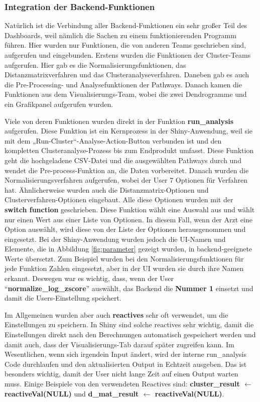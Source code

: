 \documentclass[12pt]{article}
\begin{document}
\subsubsection{Integration der Backend-Funktionen}

Natürlich ist die Verbindung aller Backend-Funktionen ein sehr großer Teil des Dashboards, weil nämlich die Sachen zu einem funktionierenden Programm führen. Hier wurden nur Funktionen, die von anderen Teams geschrieben sind, aufgerufen und eingebunden. Erstens wurden die Funktionen der Cluster-Teams aufgerufen. Hier gab es die Normalisierungsfunktionen, das Distanzmatrixverfahren und das Clusteranalyseverfahren. Daneben gab es auch die Pre-Processing- und Analysefunktionen der Pathways. Danach kamen die Funktionen aus dem Visualisierungs-Team, wobei die zwei Dendrogramme und ein Grafikpanel aufgerufen wurden. 

Viele von deren Funktionen wurden direkt in der Funktion \textbf{run\_analysis} aufgerufen. Diese Funktion ist ein Kernprozess in der Shiny-Anwendung, weil sie mit dem „Run-Cluster“-Analyse-Action-Button verbunden ist und den kompletten Clusteranalyse-Prozess bis zum Endprodukt umfasst. Diese Funktion geht die hochgeladene CSV-Datei und die ausgewählten Pathways durch und wendet die Pre-process-Funktion an, die Daten vorbereitet. Danach wurden die Normalisierungsverfahren aufgerufen, wobei der User 7 Optionen für Verfahren hat. Ähnlicherweise wurden auch die Distanzmatrix-Optionen und Clusterverfahren-Optionen eingebaut. Alle diese Optionen wurden mit der \textbf{switch function} geschrieben. Diese Funktion wählt eine Auswahl aus und wählt nur einen Wert aus einer Liste von Optionen. In diesem Fall, wenn der Arzt eine Option auswählt, wird diese von der Liste der Optionen herausgenommen und eingesetzt. Bei der Shiny-Anwendung wurden jedoch die UI-Namen und Elemente, die in Abbildung \ref{fig:parameter} gezeigt wurden, in backend-geeignete Werte übersetzt. Zum Beispiel wurden bei den Normalisierungsfunktionen für jede Funktion Zahlen eingesetzt, aber in der UI wurden sie durch ihre Namen erkannt. Deswegen war es wichtig, dass, wenn der User ``\textbf{normalize\_log\_zscore}'' auswählt, das Backend die \textbf{Nummer 1} einsetzt und damit die Users-Einstellung speichert. 

Im Allgemeinen wurden aber auch \textbf{reactives} sehr oft verwendet, um die Einstellungen zu speichern. In Shiny sind solche reactives sehr wichtig, damit die Einstellungen direkt nach den Berechnungen automatisch gespeichert werden und damit auch, dass der Visualisierungs-Tab darauf später zugreifen kann. Im Wesentlichen, wenn sich irgendein Input ändert, wird der interne run\_analysis Code durchlaufen und den aktualisierten Output in Echtzeit ausgeben. Das ist besonders wichtig, damit der User nicht lange Zeit auf einen Output warten muss. Einige Beispiele von den verwendeten Reactives sind: \textbf{cluster\_result $\leftarrow$ reactiveVal(NULL)} und \textbf{d\_mat\_result $\leftarrow$ reactiveVal(NULL)}. 
\end{document}
